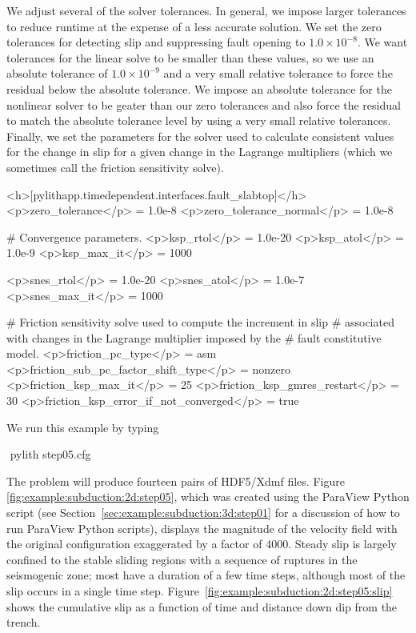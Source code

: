 We adjust several of the solver tolerances. In general, we impose
larger tolerances to reduce runtime at the expense of a less accurate
solution. We set the zero tolerances for detecting slip and
suppressing fault opening to $1.0 \times 10^{-8}$. We want tolerances
for the linear solve to be smaller than these values, so we use an
absolute tolerance of $1.0 \times 10^{-9}$ and a very small relative
tolerance to force the residual below the absolute tolerance. We
impose an absolute tolerance for the nonlinear solver to be geater
than our zero tolerances and also force the residual to match the
absolute tolerance level by using a very small relative
tolerances. Finally, we set the parameters for the solver used to
calculate consistent values for the change in slip for a given change
in the Lagrange multipliers (which we sometimes call the friction
sensitivity solve).
\begin{cfg}
<h>[pylithapp.timedependent.interfaces.fault_slabtop]</h>
<p>zero_tolerance</p> = 1.0e-8
<p>zero_tolerance_normal</p> = 1.0e-8

# Convergence parameters.
<p>ksp_rtol</p> = 1.0e-20
<p>ksp_atol</p> = 1.0e-9
<p>ksp_max_it</p> = 1000

<p>snes_rtol</p> = 1.0e-20
<p>snes_atol</p> = 1.0e-7
<p>snes_max_it</p> = 1000

# Friction sensitivity solve used to compute the increment in slip
# associated with changes in the Lagrange multiplier imposed by the
# fault constitutive model.
<p>friction_pc_type</p> = asm
<p>friction_sub_pc_factor_shift_type</p> = nonzero
<p>friction_ksp_max_it</p> = 25
<p>friction_ksp_gmres_restart</p> = 30
<p>friction_ksp_error_if_not_converged</p> = true
\end{cfg}

We run this example by typing
\begin{shell}
$$ pylith step05.cfg
\end{shell}
The problem will produce fourteen pairs of HDF5/Xdmf files. Figure
\vref{fig:example:subduction:2d:step05}, which was created using the
ParaView Python script  (see
Section~\ref{sec:example:subduction:3d:step01} for a discussion of how
  to run ParaView Python scripts), displays the
magnitude of the velocity field with the original configuration
exaggerated by a factor of 4000. Steady slip is largely confined to
the stable sliding regions with a sequence of ruptures in the
seismogenic zone; most have a duration of a few time steps, although
most of the slip occurs in a single time
step. Figure~\ref{fig:example:subduction:2d:step05:slip} shows the
cumulative slip as a function of time and distance down dip from the
trench.

